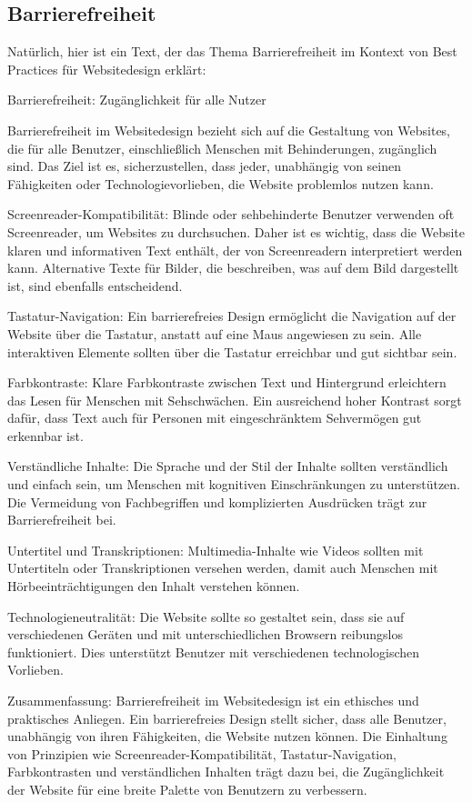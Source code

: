 \documentclass[fontsize=12pt,openright,oneside,paper=a4,BCOR=1cm]{scrbook}
\begin{document}
\subsection{Barrierefreiheit}
Natürlich, hier ist ein Text, der das Thema Barrierefreiheit im Kontext von Best Practices für Websitedesign erklärt:

Barrierefreiheit: Zugänglichkeit für alle Nutzer

Barrierefreiheit im Websitedesign bezieht sich auf die Gestaltung von Websites, die für alle Benutzer, einschließlich Menschen mit Behinderungen, zugänglich sind. Das Ziel ist es, sicherzustellen, dass jeder, unabhängig von seinen Fähigkeiten oder Technologievorlieben, die Website problemlos nutzen kann.

Screenreader-Kompatibilität: Blinde oder sehbehinderte Benutzer verwenden oft Screenreader, um Websites zu durchsuchen. Daher ist es wichtig, dass die Website klaren und informativen Text enthält, der von Screenreadern interpretiert werden kann. Alternative Texte für Bilder, die beschreiben, was auf dem Bild dargestellt ist, sind ebenfalls entscheidend.

Tastatur-Navigation: Ein barrierefreies Design ermöglicht die Navigation auf der Website über die Tastatur, anstatt auf eine Maus angewiesen zu sein. Alle interaktiven Elemente sollten über die Tastatur erreichbar und gut sichtbar sein.

Farbkontraste: Klare Farbkontraste zwischen Text und Hintergrund erleichtern das Lesen für Menschen mit Sehschwächen. Ein ausreichend hoher Kontrast sorgt dafür, dass Text auch für Personen mit eingeschränktem Sehvermögen gut erkennbar ist.

Verständliche Inhalte: Die Sprache und der Stil der Inhalte sollten verständlich und einfach sein, um Menschen mit kognitiven Einschränkungen zu unterstützen. Die Vermeidung von Fachbegriffen und komplizierten Ausdrücken trägt zur Barrierefreiheit bei.

Untertitel und Transkriptionen: Multimedia-Inhalte wie Videos sollten mit Untertiteln oder Transkriptionen versehen werden, damit auch Menschen mit Hörbeeinträchtigungen den Inhalt verstehen können.

Technologieneutralität: Die Website sollte so gestaltet sein, dass sie auf verschiedenen Geräten und mit unterschiedlichen Browsern reibungslos funktioniert. Dies unterstützt Benutzer mit verschiedenen technologischen Vorlieben.

Zusammenfassung:
Barrierefreiheit im Websitedesign ist ein ethisches und praktisches Anliegen. Ein barrierefreies Design stellt sicher, dass alle Benutzer, unabhängig von ihren Fähigkeiten, die Website nutzen können. Die Einhaltung von Prinzipien wie Screenreader-Kompatibilität, Tastatur-Navigation, Farbkontrasten und verständlichen Inhalten trägt dazu bei, die Zugänglichkeit der Website für eine breite Palette von Benutzern zu verbessern.
\end{document}

